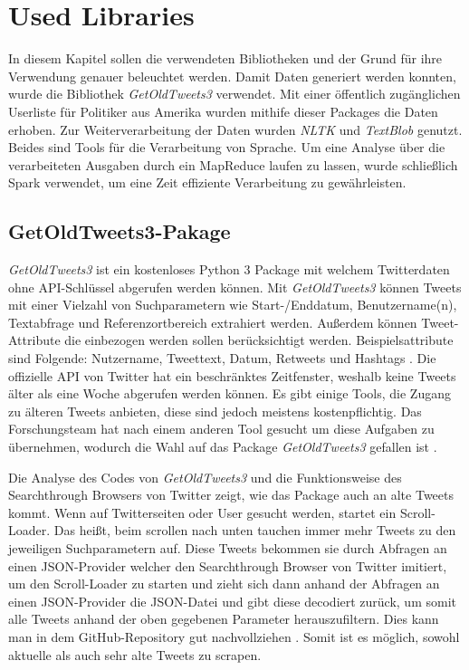 \section{Used Libraries}

In diesem Kapitel sollen die verwendeten Bibliotheken und der Grund für ihre Verwendung genauer beleuchtet werden. Damit Daten generiert werden konnten, wurde die Bibliothek \textit{GetOldTweets3} verwendet. Mit einer öffentlich zugänglichen Userliste für Politiker aus Amerika wurden mithife dieser Packages die Daten erhoben. Zur Weiterverarbeitung der Daten wurden \textit{NLTK} und \textit{TextBlob} genutzt. Beides sind Tools für die Verarbeitung von Sprache. Um eine Analyse über die verarbeiteten Ausgaben durch ein MapReduce laufen zu lassen, wurde schließlich Spark verwendet, um eine Zeit effiziente Verarbeitung zu gewährleisten.
	
\subsection{GetOldTweets3-Pakage}
	
\textit{GetOldTweets3} ist ein kostenloses Python 3 Package mit welchem Twitterdaten ohne API-Schlüssel abgerufen werden können. Mit \textit{GetOldTweets3} können Tweets mit einer Vielzahl von Suchparametern wie Start-/Enddatum, Benutzername(n), Textabfrage und Referenzortbereich extrahiert werden. Außerdem können Tweet-Attribute die einbezogen werden sollen berücksichtigt werden. Beispielsattribute sind Folgende: Nutzername, Tweettext, Datum, Retweets und Hashtags . Die offizielle API von Twitter hat ein beschränktes Zeitfenster, weshalb keine Tweets älter als eine Woche abgerufen werden können. Es gibt einige Tools, die Zugang zu älteren Tweets anbieten, diese sind jedoch meistens kostenpflichtig. Das Forschungsteam hat nach einem anderen Tool gesucht um diese Aufgaben zu übernehmen, wodurch die Wahl auf das Package  \textit{GetOldTweets3} gefallen ist .

Die Analyse des Codes von \textit{GetOldTweets3} und die Funktionsweise des Searchthrough Browsers von Twitter zeigt, wie das Package auch an alte Tweets kommt. Wenn auf Twitterseiten oder User gesucht werden, startet ein Scroll-Loader. Das heißt, beim scrollen nach unten tauchen immer mehr Tweets zu den jeweiligen Suchparametern auf. Diese Tweets bekommen sie durch Abfragen an einen JSON-Provider welcher den Searchthrough Browser von Twitter imitiert, um den Scroll-Loader zu starten und zieht sich dann anhand der Abfragen an einen JSON-Provider die JSON-Datei und gibt diese decodiert zurück, um somit alle Tweets anhand der oben gegebenen Parameter herauszufiltern. Dies kann man in dem GitHub-Repository gut nachvollziehen . Somit ist es möglich, sowohl aktuelle als auch sehr alte Tweets zu scrapen.
	
